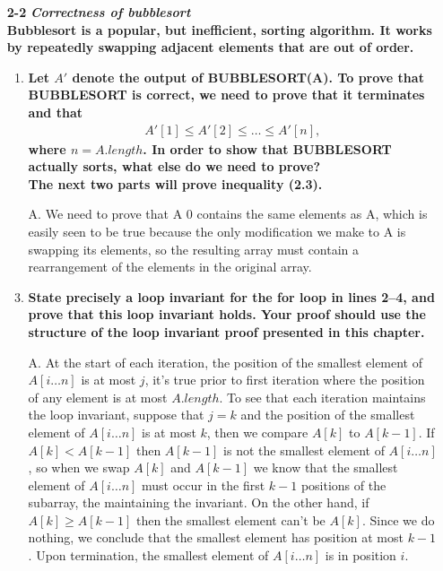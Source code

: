 \documentclass[fontsize=12pt,paper=a4,open=any]{book}
\begin{document}
\begin{enumerate}
	\item[\textbf{2-2}]
	\textbf{\textit{Correctness of bubblesort}\\
	Bubblesort is a popular, but inefficient, sorting algorithm. It works by repeatedly
swapping adjacent elements that are out of order.}
	
	\begin{enumerate}
		\item \textbf{Let $A'$ denote the output of BUBBLESORT(A). To prove that BUBBLESORT is correct, we need to prove that it terminates and that
		\begin{align}
		A'[1] \leq A'[2] \leq \dots \leq A'[n],		\label{2.3}
		\end{align}
		where $n=A.length$. In order to show that BUBBLESORT actually sorts, what else do we need to prove?\\
		The next two parts will prove inequality (2.3).}
		\item[A.]
		We need to prove that A 0 contains the same elements as A, which is easily seen to be true because the only modification we make to A is swapping its elements, so the resulting array must contain a rearrangement of the elements in the original array.
		
		\item \textbf{State precisely a loop invariant for the for loop in lines 2–4, and prove that this loop invariant holds. Your proof should use the structure of the loop invariant proof presented in this chapter.}
		\item[A.]
		At the start of each iteration, the position of the smallest element of
$A[i \dots n]$ is at most $j$, it’s true prior to first iteration where the position of any element is at most $A.length$. To see that each iteration maintains the loop invariant, suppose that $j = k$ and the position of the smallest element of $A[i \dots n]$ is at most $k$, then we compare $A[k]$ to $A[k-1]$. If $A[k] < A[k-1]$ then $A[k-1]$ is not the smallest element of $A[i \dots n]$, so when we swap $A[k]$ and $A[k-1]$ we know that the smallest element of $A[i \dots n]$ must occur in the first $k-1$ positions of the subarray, the maintaining the invariant. On the other hand, if $A[k] \geq A[k-1]$ then the smallest element can’t be $A[k]$. Since we do nothing, we conclude that the smallest element has position at most $k-1$. Upon termination, the smallest element of $A[i \dots n]$ is in position $i$.
		

\end{enumerate}
\end{enumerate}
\end{document}

